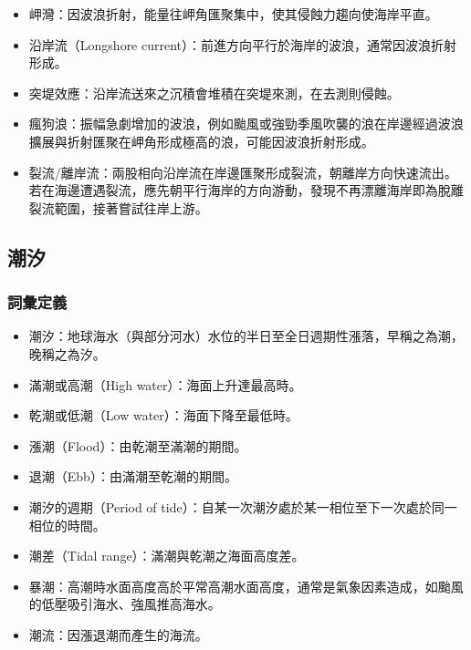 \documentclass[a4paper,12pt]{report}
\begin{document}
\begin{itemize}
\item 岬灣：因波浪折射，能量往岬角匯聚集中，使其侵蝕力趨向使海岸平直。
\item 沿岸流（Longshore current）：前進方向平行於海岸的波浪，通常因波浪折射形成。
\item 突堤效應：沿岸流送來之沉積會堆積在突堤來測，在去測則侵蝕。
\item 瘋狗浪：振幅急劇增加的波浪，例如颱風或強勁季風吹襲的浪在岸邊經過波浪擴展與折射匯聚在岬角形成極高的浪，可能因波浪折射形成。
\item 裂流/離岸流：兩股相向沿岸流在岸邊匯聚形成裂流，朝離岸方向快速流出。若在海邊遭遇裂流，應先朝平行海岸的方向游動，發現不再漂離海岸即為脫離裂流範圍，接著嘗試往岸上游。
\end{itemize}
\subsection{潮汐}
\subsubsection{詞彙定義}
\begin{itemize}
\item 潮汐：地球海水（與部分河水）水位的半日至全日週期性漲落，早稱之為潮，晚稱之為汐。
\item 滿潮或高潮（High water）：海面上升達最高時。
\item 乾潮或低潮（Low water）：海面下降至最低時。
\item 漲潮（Flood）：由乾潮至滿潮的期間。
\item 退潮（Ebb）：由滿潮至乾潮的期間。
\item 潮汐的週期（Period of tide）：自某一次潮汐處於某一相位至下一次處於同一相位的時間。
\item 潮差（Tidal range）：滿潮與乾潮之海面高度差。
\item 暴潮：高潮時水面高度高於平常高潮水面高度，通常是氣象因素造成，如颱風的低壓吸引海水、強風推高海水。
\item 潮流：因漲退潮而產生的海流。
\end{itemize}
\end{document}

